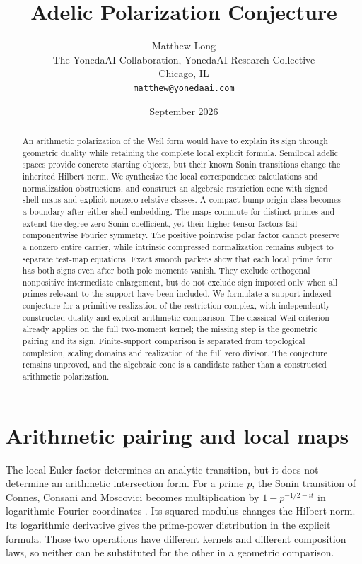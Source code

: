 \documentclass[11pt,letterpaper]{article}
\title{Adelic Polarization Conjecture}
\author{Matthew Long\\
 \small The YonedaAI Collaboration, YonedaAI Research Collective\\
 \small Chicago, IL\\
 \small \texttt{matthew@yonedaai.com}}
\date{September 2026}
\theoremstyle{definition}
\theoremstyle{remark}
\begin{document}
\maketitle
\begin{abstract}
An arithmetic polarization of the Weil form would have to explain its sign through geometric duality while retaining the complete local explicit formula. Semilocal adelic spaces provide concrete starting objects, but their known Sonin transitions change the inherited Hilbert norm. We synthesize the local correspondence calculations and normalization obstructions, and construct an algebraic restriction cone with signed shell maps and explicit nonzero relative classes. A compact-bump origin class becomes a boundary after either shell embedding. The maps commute for distinct primes and extend the degree-zero Sonin coefficient, yet their higher tensor factors fail componentwise Fourier symmetry. The positive pointwise polar factor cannot preserve a nonzero entire carrier, while intrinsic compressed normalization remains subject to separate test-map equations. Exact smooth packets show that each local prime form has both signs even after both pole moments vanish. They exclude orthogonal nonpositive intermediate enlargement, but do not exclude sign imposed only when all primes relevant to the support have been included. We formulate a support-indexed conjecture for a primitive realization of the restriction complex, with independently constructed duality and explicit arithmetic comparison. The classical Weil criterion already applies on the full two-moment kernel; the missing step is the geometric pairing and its sign. Finite-support comparison is separated from topological completion, scaling domains and realization of the full zero divisor. The conjecture remains unproved, and the algebraic cone is a candidate rather than a constructed arithmetic polarization.
\end{abstract}

\section{Arithmetic pairing and local maps}

The local Euler factor determines an analytic transition, but it does not
determine an arithmetic intersection form. For a prime $p$, the Sonin
transition of Connes, Consani and Moscovici becomes multiplication by
$1-p^{-1/2-it}$ in logarithmic Fourier coordinates
\cite[Sections 4.5 to 4.8]{CCM}. Its squared modulus changes the Hilbert
norm. Its logarithmic derivative gives the prime-power distribution in
the explicit formula. Those two operations have different kernels and
different composition laws, so neither can be substituted for the other
in a geometric comparison.
\end{document}
